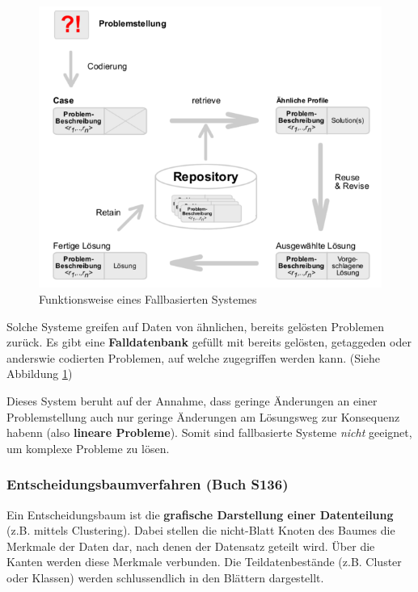 \documentclass[a4paper, 11pt, nofootinbib]{article}
\begin{document}
\begin{figure}
	\centering
	\includegraphics[keepaspectratio=true,height=12\baselineskip]{fallbasiert.png}
	\caption{Funktionsweise eines Fallbasierten Systemes}
	\label{fig:fallbasiert}
\end{figure}

Solche Systeme greifen auf Daten von ähnlichen, bereits gelösten Problemen zurück. Es gibt eine \textbf{Falldatenbank} gefüllt mit bereits gelösten, getaggeden oder anderswie codierten Problemen, auf welche zugegriffen werden kann. (Siehe Abbildung \ref{fig:fallbasiert})

Dieses System beruht auf der Annahme, dass geringe Änderungen an einer Problemstellung auch nur geringe Änderungen am Lösungsweg zur Konsequenz habenn (also \textbf{lineare Probleme}). Somit sind fallbasierte Systeme \textit{nicht} geeignet, um komplexe Probleme zu lösen.

\newpage

\subsubsection{Entscheidungsbaumverfahren (Buch S136)}
Ein Entscheidungsbaum ist die \textbf{grafische Darstellung einer Datenteilung} (z.B. mittels Clustering). Dabei stellen die nicht-Blatt Knoten des Baumes die Merkmale der Daten dar, nach denen der Datensatz geteilt wird. Über die Kanten werden diese Merkmale verbunden. Die Teildatenbestände (z.B. Cluster oder Klassen) werden schlussendlich in den Blättern dargestellt.
\end{document}

